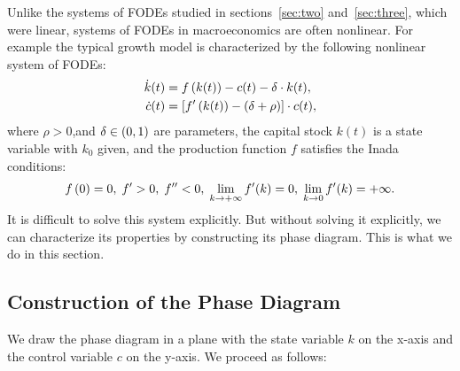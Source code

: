 \documentclass[letterpaper,12pt,leqno]{article}
\begin{document}
Unlike the systems of FODEs studied in sections~\ref{sec:two} and~\ref{sec:three}, which were linear, systems of FODEs in macroeconomics are often nonlinear. For example the typical growth model is characterized by the following nonlinear system of FODEs:
\begin{align}
\dot{k}(t) &=f\left( k(t) \right) -c(t)-\delta \cdot k(t),  \label{eq:growth1} \\
\dot{c}(t) &=\left[ f'\left( k(t) \right) -\left( \delta+\rho \right) \right]\cdot c(t), \label{eq:growth2}
\end{align}
where $\rho >0$,and $\delta \in \left( 0,1 \right)$ are parameters, the capital stock $k(t)$ is a state variable
with $k_{0}$ given, and the production function $f$ satisfies the Inada conditions:
\begin{align*}
f\left( 0 \right)=0,\; f'>0,\;f''<0,\;\lim_{k\to +\infty}f'(k)=0,\;\lim_{k\to 0}f'(k) =+\infty.
\end{align*}
It is difficult to solve this system explicitly. But without solving it explicitly, we can characterize its properties by constructing its phase diagram. This is what we do in this section.

\subsection{Construction of the Phase Diagram}

We draw the phase diagram in a plane with the state variable $k$ on the x-axis and the control variable $c$ on the y-axis. We proceed as follows:
\end{document}
